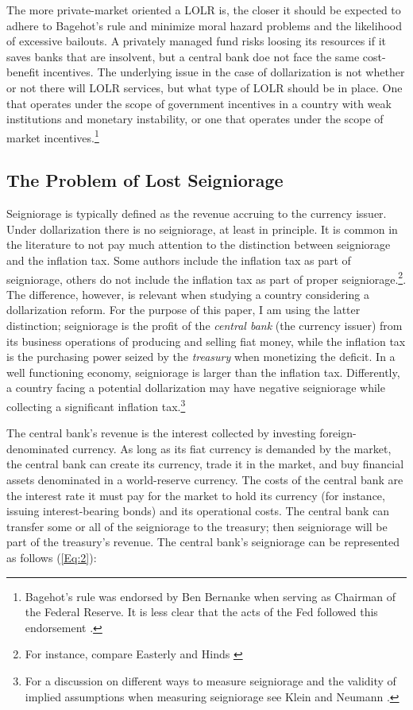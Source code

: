 \documentclass[12pt]{article}
\begin{document}
The more private-market oriented a LOLR is, the closer it should be expected to adhere to Bagehot's rule and minimize moral hazard problems and the likelihood of excessive bailouts. A privately managed fund risks loosing its resources if it saves banks that are insolvent, but a central bank doe not face the same cost-benefit incentives. The underlying issue in the case of dollarization is not whether or not there will LOLR services, but what type of LOLR should be in place. One that operates under the scope of government incentives in a country with weak institutions and monetary instability, or one that operates under the scope of market incentives.\footnote{Bagehot's rule was endorsed by Ben Bernanke when serving as Chairman of the Federal Reserve. It is less clear that the acts of the Fed followed this endorsement \parencite{Hogan2015b}.}

\subsection{The Problem of Lost Seigniorage}

Seigniorage is typically defined as the revenue accruing to the currency issuer. Under dollarization there is no seigniorage, at least in principle. It is common in the literature to not pay much attention to the distinction between seigniorage and the inflation tax. Some authors include the inflation tax as part of seigniorage, others do not include the inflation tax as part of proper seigniorage.\footnote{For instance, compare Easterly \parencite*[][fn. 1]{Easterly1995} and Hinds \parencite*[][ch. 6]{Hinds2006a}}. The difference, however, is relevant when studying a country considering a dollarization reform. For the purpose of this paper, I am using the latter distinction; seigniorage is the profit of the \textit{central bank} (the currency issuer) from its business operations of producing and selling fiat money, while the inflation tax is the purchasing power seized by the \textit{treasury} when monetizing the deficit. In a well functioning economy, seigniorage is larger than the inflation tax. Differently, a country facing a potential dollarization may have negative seigniorage while collecting a significant inflation tax.\footnote{For a discussion on different ways to measure seigniorage and the validity of implied assumptions when measuring seigniorage see Klein and Neumann \parencite*{Klein1990}.}

The central bank's revenue is the interest collected by investing foreign-denominated currency. As long as its fiat currency is demanded by the market, the central bank can create its currency, trade it in the market, and buy financial assets denominated in a world-reserve currency. The costs of the central bank are the interest rate it must pay for the market to hold its currency (for instance, issuing interest-bearing bonds) and its operational costs. The central bank can transfer some or all of the seigniorage to the treasury; then seigniorage will be part of the treasury's revenue. The central bank's seigniorage can be represented as follows (\ref{Eq:2}):
\end{document}
